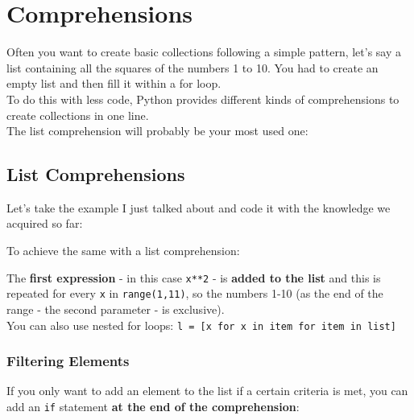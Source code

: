 \section{Comprehensions}

    Often you want to create basic collections following a simple pattern, let's say a list
    containing all the squares of the numbers 1 to 10. You had to create an empty list and then
    fill it within a for loop. \\
    To do this with less code, Python provides different kinds of comprehensions to create
    collections in one line. \\
    The list comprehension will probably be your most used one:

    \subsection{List Comprehensions}

        Let's take the example I just talked about and code it with the knowledge we
        acquired so far:


        To achieve the same with a list comprehension:


        The \textbf{first expression} - in this case \texttt{x**2} -
        is \textbf{added to the list} and this is repeated for every \texttt{x} in
        \texttt{range(1,11)}, so the numbers 1-10 (as the end of the range -
        the second parameter - is exclusive). \\
        You can also use nested for loops:
        \texttt{l = [x for x in item for item in list]}

        \subsubsection{Filtering Elements}

            If you only want to add an element to the list if a certain criteria is met, you can add
            an \texttt{if} statement \textbf{at the end of the comprehension}:


